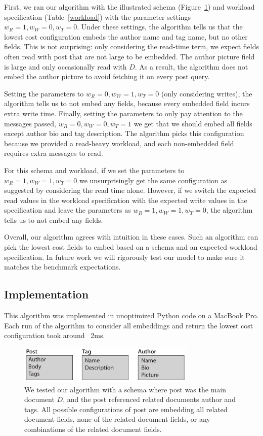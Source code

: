 First, we ran our algorithm with the illustrated schema (Figure~\ref{fig:schema}) and workload specification (Table~\ref{workload}) with the parameter settings $w_R = 1, w_W = 0, w_T = 0$. Under these settings, the algorithm tells us that the lowest cost configuration embeds the author name and tag name, but no other fields. 
This is not surprising: only considering the read-time term, we expect fields often read with post that are not large to be embedded. 
The author picture field is large and only occasionally read with $D$.
As a result, the algorithm does not embed the author picture to avoid fetching it on every post query.

Setting the parameters to $w_R = 0, w_W = 1, w_T = 0$ (only considering writes), the algorithm tells us to not embed any fields, because every embedded field incurs extra write time.
Finally, setting the parameters to only pay attention to the messages passed, $w_R = 0, w_W = 0, w_T = 1$ we get that we should embed all fields except author bio and tag description. 
The algorithm picks this configuration because we provided a read-heavy workload, and each non-embedded field requires extra messages to read. 

For this schema and workload, if we set the parameters to $w_R = 1, w_W = 1, w_T = 0$ we unsurprisingly get the same configuration as suggested by considering the read time alone. 
However, if we switch the expected read values in the workload specification with the expected write values in the specification and leave the parameters as  $w_R = 1, w_W = 1, w_T = 0$, the algorithm tells us to not embed any fields. 

Overall, our algorithm agrees with intuition in these cases. Such an algorithm can pick the lowest cost fields to embed based on a schema and an expected workload specification. In future work we will rigorously test our model to make sure it matches the benchmark expectations. 

\subsection{Implementation}
This algorithm was implemented in unoptimized Python code on a MacBook Pro. Each run of the algorithm to consider all embeddings and return the lowest cost configuration took around ~2ms.

\begin{figure}[t]
\centering
\includegraphics[width=3.33in]{figures/algorithm-schema.pdf}
\caption{We tested our algorithm with a schema where post was the main document $D$, and the post referenced related documents author and tags. All possible configurations of post are embedding all related document fields, none of the related document fields, or any combinations of the related document fields.}
\label{fig:schema}
\end{figure}


